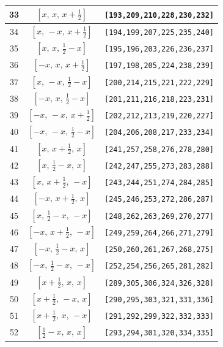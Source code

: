 \documentclass[fleqn,8pt]{jsarticle}
\begin{document}
\begin{longtable}{ccc}
33 & $\left[ x,\, x,\, x + \frac{1}{2} \right]$ & {\tt [193,209,210,228,230,232]} \\ \hline
34 & $\left[ x,\, - x,\, x + \frac{1}{2} \right]$ & {\tt [194,199,207,225,235,240]} \\ \hline
35 & $\left[ x,\, x,\, \frac{1}{2} - x \right]$ & {\tt [195,196,203,226,236,237]} \\ \hline
36 & $\left[ - x,\, x,\, x + \frac{1}{2} \right]$ & {\tt [197,198,205,224,238,239]} \\ \hline
37 & $\left[ x,\, - x,\, \frac{1}{2} - x \right]$ & {\tt [200,214,215,221,222,229]} \\ \hline
38 & $\left[ - x,\, x,\, \frac{1}{2} - x \right]$ & {\tt [201,211,216,218,223,231]} \\ \hline
39 & $\left[ - x,\, - x,\, x + \frac{1}{2} \right]$ & {\tt [202,212,213,219,220,227]} \\ \hline
40 & $\left[ - x,\, - x,\, \frac{1}{2} - x \right]$ & {\tt [204,206,208,217,233,234]} \\ \hline
41 & $\left[ x,\, x + \frac{1}{2},\, x \right]$ & {\tt [241,257,258,276,278,280]} \\ \hline
42 & $\left[ x,\, \frac{1}{2} - x,\, x \right]$ & {\tt [242,247,255,273,283,288]} \\ \hline
43 & $\left[ x,\, x + \frac{1}{2},\, - x \right]$ & {\tt [243,244,251,274,284,285]} \\ \hline
44 & $\left[ - x,\, x + \frac{1}{2},\, x \right]$ & {\tt [245,246,253,272,286,287]} \\ \hline
45 & $\left[ x,\, \frac{1}{2} - x,\, - x \right]$ & {\tt [248,262,263,269,270,277]} \\ \hline
46 & $\left[ - x,\, x + \frac{1}{2},\, - x \right]$ & {\tt [249,259,264,266,271,279]} \\ \hline
47 & $\left[ - x,\, \frac{1}{2} - x,\, x \right]$ & {\tt [250,260,261,267,268,275]} \\ \hline
48 & $\left[ - x,\, \frac{1}{2} - x,\, - x \right]$ & {\tt [252,254,256,265,281,282]} \\ \hline
49 & $\left[ x + \frac{1}{2},\, x,\, x \right]$ & {\tt [289,305,306,324,326,328]} \\ \hline
50 & $\left[ x + \frac{1}{2},\, - x,\, x \right]$ & {\tt [290,295,303,321,331,336]} \\ \hline
51 & $\left[ x + \frac{1}{2},\, x,\, - x \right]$ & {\tt [291,292,299,322,332,333]} \\ \hline
52 & $\left[ \frac{1}{2} - x,\, x,\, x \right]$ & {\tt [293,294,301,320,334,335]} \\ \hline

\end{longtable}
\end{document}
